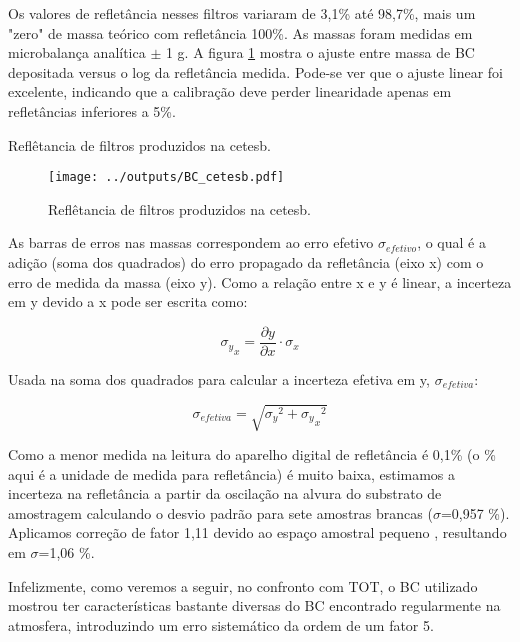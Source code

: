 Os valores de refletância nesses filtros variaram de 3,1\% até 98,7\%, mais um 
"zero" de massa teórico com refletância 100\%. As massas foram medidas em 
microbalança analítica $\pm$ 1 g. A figura \ref{fig:bc_cetesb} mostra o ajuste 
entre massa de BC depositada versus o log da refletância medida. Pode-se ver 
que o ajuste linear foi excelente,
indicando que a calibração deve perder linearidade apenas em refletâncias 
inferiores a 5\%.

\newpage
\begin{table}[H]
	\centering
	\small
	
	\caption{Reflêtancia de filtros produzidos na cetesb. \label{table:bc_cetesb}}
\end{table} 

\begin{figure}[H]
	\centering
	\texttt{[image: ../outputs/BC\_cetesb.pdf]}
	\caption{Reflêtancia de filtros produzidos na cetesb. \label{fig:bc_cetesb}}
\end{figure}

As barras de erros nas massas correspondem ao erro efetivo $\sigma_{efetivo}$, 
o qual é a adição (soma dos quadrados) do erro propagado da refletância (eixo x)
com o erro de medida da massa (eixo y). Como a relação entre x e y é linear, 
a incerteza em y devido a x pode ser escrita como:

\begin{equation}
  {\sigma_y}_x = \frac{\partial y}{\partial x} \cdot \sigma_x
\end{equation} 

Usada na soma dos quadrados para calcular a incerteza efetiva em y, 
$\sigma_{efetiva}$: 

\begin{equation}
  \sigma_{efetiva} = \sqrt{{\sigma_y}^2 + {{\sigma_y}_x}^2}
\end{equation} 

Como a menor medida na leitura do aparelho digital de refletância é 0,1\%
(o \% aqui é a unidade de medida para refletância) é muito baixa, estimamos 
a incerteza na refletância a partir da oscilação na alvura do substrato de 
amostragem calculando o desvio padrão para sete amostras 
brancas ($\sigma$=0,957 \%). Aplicamos correção de fator 1,11 devido ao 
espaço amostral pequeno \citep{helene1981}, resultando em $\sigma$=1,06 \%.

Infelizmente, como veremos a seguir, no confronto com TOT, o BC utilizado 
mostrou ter características bastante diversas do BC encontrado regularmente 
na atmosfera, introduzindo um erro sistemático da ordem de um fator 5.  


